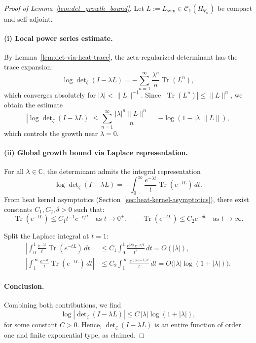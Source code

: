 \begin{proof}[Proof of Lemma~\ref{lem:det_growth_bound}]
Let \( L := L_{\mathrm{sym}} \in \mathcal{C}_1(H_{\Psi_\alpha}) \) be compact and self-adjoint.

\paragraph{(i) Local power series estimate.}
By Lemma~\ref{lem:det-via-heat-trace}, the zeta-regularized determinant has the trace expansion:
\[
\log \det\nolimits_\zeta(I - \lambda L)
= - \sum_{n=1}^\infty \frac{\lambda^n}{n} \operatorname{Tr}(L^n),
\]
which converges absolutely for \( |\lambda| < \|L\|^{-1} \). Since \( |\operatorname{Tr}(L^n)| \le \|L\|^n \), we obtain the estimate
\[
\left| \log \det\nolimits_\zeta(I - \lambda L) \right|
\le \sum_{n=1}^\infty \frac{|\lambda|^n \|L\|^n}{n}
= - \log(1 - |\lambda| \|L\|),
\]
which controls the growth near \( \lambda = 0 \).

\paragraph{(ii) Global growth bound via Laplace representation.}
For all \( \lambda \in \mathbb{C} \), the determinant admits the integral representation
\[
\log \det\nolimits_\zeta(I - \lambda L)
= - \int_0^\infty \frac{e^{-\lambda t}}{t} \operatorname{Tr}(e^{-tL})\, dt.
\]
From heat kernel asymptotics (Section~\ref{sec:heat-kernel-asymptotics}), there exist constants \( C_1, C_2, \delta > 0 \) such that:
\[
\operatorname{Tr}(e^{-tL}) \le C_1 t^{-1} e^{-c/t} \quad \text{as } t \to 0^+, \qquad
\operatorname{Tr}(e^{-tL}) \le C_2 e^{-\delta t} \quad \text{as } t \to \infty.
\]

Split the Laplace integral at \( t = 1 \):
\begin{align*}
\left| \int_0^1 \frac{e^{-\lambda t}}{t} \operatorname{Tr}(e^{-tL})\, dt \right|
&\le C_1 \int_0^1 \frac{e^{|\lambda| t} e^{-c/t}}{t^2} \, dt
= O(|\lambda|), \\
\left| \int_1^\infty \frac{e^{-\lambda t}}{t} \operatorname{Tr}(e^{-tL})\, dt \right|
&\le C_2 \int_1^\infty \frac{e^{(|\lambda| - \delta)t}}{t} \, dt
= O\big(|\lambda| \log(1 + |\lambda|)\big).
\end{align*}

\paragraph{Conclusion.}
Combining both contributions, we find
\[
\log \left| \det\nolimits_\zeta(I - \lambda L) \right|
\le C\, |\lambda| \log(1 + |\lambda|),
\]
for some constant \( C > 0 \). Hence, \( \det_\zeta(I - \lambda L) \) is an entire function of order one and finite exponential type, as claimed.
\end{proof}
%  